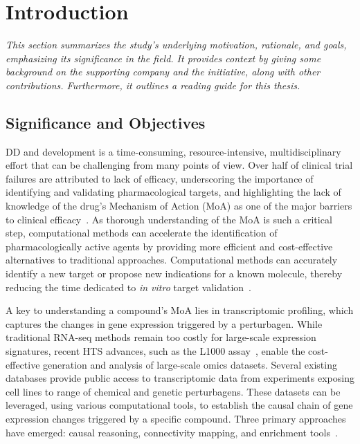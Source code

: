 ﻿%

%

\makeatletter
\newcommand{\ntifpkgloaded}{%
  \@ifpackageloaded%
}
\makeatother

\chapter{Introduction}
\label{cha:introduction}

\textit{This section summarizes the study's underlying motivation, rationale, and goals, emphasizing its significance in the field. It provides context by giving some background on the supporting company and the initiative, along with other contributions. Furthermore, it outlines a reading guide for this thesis.}

\section{Significance and Objectives} %
\label{sec:significanceandobjectives}


\gls{DD} and development is a time-consuming, resource-intensive, multidisciplinary effort that can be challenging from many points of view. 
Over half of clinical trial failures are attributed to lack of efficacy, underscoring the importance of identifying and validating pharmacological targets, and highlighting the lack of knowledge of the drug's \gls{Mechanism of Action (MoA)} as one of the major barriers to clinical efficacy~\cite{RN3, RN1, RN2}. 
As thorough understanding of the \gls{MoA} is such a critical step, computational methods can accelerate the identification of pharmacologically active agents by providing more efficient and cost-effective alternatives to traditional approaches. 
Computational methods can accurately identify a new target or propose new indications for a known molecule, thereby reducing the time dedicated to \textit{in vitro} target validation~\cite{RN29}.

A key to understanding a compound's \gls{MoA} lies in transcriptomic profiling, which captures the changes in gene expression triggered by a perturbagen. 
While traditional \gls{RNA-seq} methods remain too costly for large-scale expression signatures, recent \gls{HTS} advances, such as the L1000 assay~\cite{RN30}, enable the cost-effective generation and analysis of large-scale omics datasets. 
Several existing databases provide public access to transcriptomic data from experiments exposing cell lines to range of chemical and genetic perturbagens. 
These datasets can be leveraged, using various computational tools, to establish the causal chain of gene expression changes triggered by a specific compound. 
Three primary approaches have emerged: causal reasoning, connectivity mapping, and enrichment tools~\cite{RN31}.

